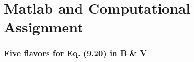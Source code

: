 \documentclass[11pt,a4paper]{article}
\begin{document}
\begin{titlepage}
    \maketitle
\end{titlepage}
\renewcommand{\contentsname}{Table of Contents}
\begin{center} 
    \tableofcontents 
    \listoffigures
\end{center}
\newpage
\newtheorem{remark}{Remark}
\part{Matlab and Computational Assignment}
\section{Five flavors for Eq. (9.20) in B \& V}
\end{document}
